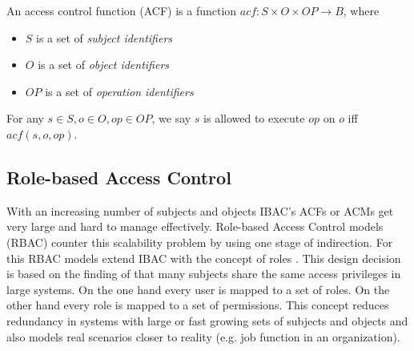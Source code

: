 \documentclass[twoside, openright, 12pt]{book}
\begin{document}
\begin{definition}
An access control function (ACF) is a function $acf: S \times O \times OP \rightarrow B$, where
\vspace{-2mm}
\begin{itemize}
\item $S$ is a set of \textit{subject identifiers}
\item $O$ is a set of \textit{object identifiers}
\item $OP$ is a set of \textit{operation identifiers}
\end{itemize} 
\vspace{-2mm}
For any $s \in S, o \in O, op \in OP$, we say $s$ is allowed to execute $op$ on $o$ iff $acf(s,o,op)$.
\end{definition}



\subsection{Role-based Access Control}
\label{RBAC}
With an increasing number of subjects and objects IBAC's ACFs or ACMs get very large and hard to manage effectively.
Role-based Access Control models (RBAC) counter this scalability problem by using one stage of indirection.
For this RBAC models extend IBAC with the concept of roles \citep{Sandhu96}.
This design decision is based on the finding of \cite{Sandhu96} that many subjects share the same access privileges in large systems.
On the one hand every user is mapped to a set of roles.
On the other hand every role is mapped to a set of permissions.
This concept reduces redundancy in systems with large or fast growing sets of subjects and objects and also models real scenarios closer to reality (e.g. job function in an organization).
\end{document}
